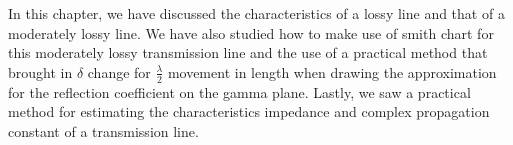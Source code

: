 In this chapter, we have discussed the characteristics of a lossy line and that of a moderately lossy line. We have also studied how to make use of smith chart for this moderately lossy transmission line and the use of a practical method that brought in $\delta$ change for $\frac{\lambda}{2}$ movement in length when drawing the approximation for the reflection coefficient on the gamma plane. Lastly, we saw a practical method for estimating the characteristics impedance and complex propagation constant of a transmission line.
